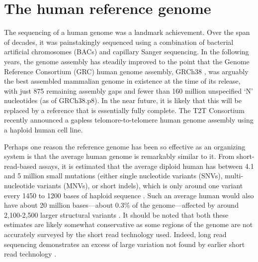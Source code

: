 \documentclass[11pt]{ucthesis}
\begin{document}
\section{The human reference genome}

The sequencing of a human genome was a landmark achievement. Over the span of decades, it was painstakingly sequenced using a combination of bacterial artificial chromosomes (BACs) and capillary Sanger sequencing\cite{lander2001initial}. In the following years, the genome assembly has steadily improved \cite{international2004finishing,church2011modernizing} to the point that the Genome Reference Consortium (GRC) human genome assembly, GRCh38 \cite{schneider2017evaluation}, was arguably the best assembled mammalian genome in existence at the time of its release, with just 875 remaining assembly gaps and fewer than 160 million unspecified `N' nucleotides (as of GRCh38.p8). In the near future, it is likely that this will be replaced by a reference that is essentially fully complete. The T2T Consortium recently announced a gapless telomore-to-telomere human genome assembly using a haploid human cell line\cite{nurk2021complete}. 



Perhaps one reason the reference genome has been so effective as an organizing system is that the average human genome is remarkably similar to it. From short-read-based assays, it is estimated that the average diploid human has between 4.1 and 5 million small mutations (either single nucleotide variants (SNVs), multi-nucleotide variants (MNVs), or short indels), which is only around one variant every 1450 to 1200 bases of haploid sequence \cite{10002015global}. Such an average human would also have about 20 million bases---about 0.3\% of the genome---affected by around 2,100-2,500 larger structural variants \cite{10002015global}. It should be noted that both these estimates are likely somewhat conservative as some regions of the genome are not accurately surveyed by the short read technology used. Indeed, long read sequencing demonstrates an excess of large variation not found by earlier short read technology \cite{chaisson2015resolving,seo2016novo}.
\end{document}
